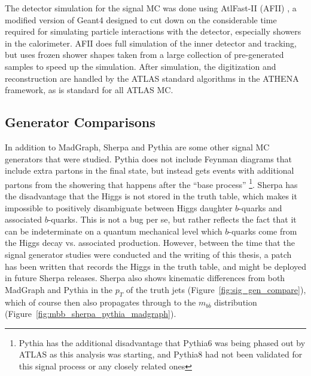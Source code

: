 The detector simulation for the signal MC was done using AtlFast-II (AFII) \cite{ATF2}, 
a modified version of Geant4 \cite{Geant4-1, Geant4-2} designed 
to cut down on the considerable time required for simulating particle interactions with the detector, especially 
showers in the calorimeter.  AFII does full simulation of the inner detector and tracking, but 
uses frozen shower shapes taken from a large collection of pre-generated samples to speed up 
the simulation.  After simulation, the digitization and reconstruction are handled by the ATLAS standard algorithms 
in the ATHENA framework, as is standard for all ATLAS MC.    



\subsection{Generator Comparisons}
In addition to MadGraph, Sherpa and Pythia are some other signal MC generators that 
were studied.  Pythia does not include Feynman diagrams that include extra partons 
in the final state, but instead gets events with additional partons from the showering
that happens after the ``base process'' \footnote{Pythia has the additional disadvantage
that Pythia6 was being phased out by ATLAS as this analysis was starting, and Pythia8 
had not been validated for this signal process or any closely related ones}.  
Sherpa has the disadvantage that
the Higgs is not stored in the truth table, which makes it impossible to positively
disambiguate between Higgs daughter $b$-quarks and associated $b$-quarks.  This is not
a bug per se, but rather reflects the fact that it can be indeterminate on a quantum mechanical level
which $b$-quarks come from the Higgs decay vs. associated production.  However, between
the time that the signal generator studies were conducted and the writing of this thesis,
a patch has been written that records the Higgs in the truth table, and might be 
deployed in future Sherpa releases.  Sherpa
also shows kinematic differences from both MadGraph and Pythia in the $p_T$ of the truth
jets (Figure~\ref{fig:sig_gen_compare}), which of course then also propagates through to the $m_{b\bar{b}}$ distribution
(Figure~\ref{fig:mbb_sherpa_pythia_madgraph}).


